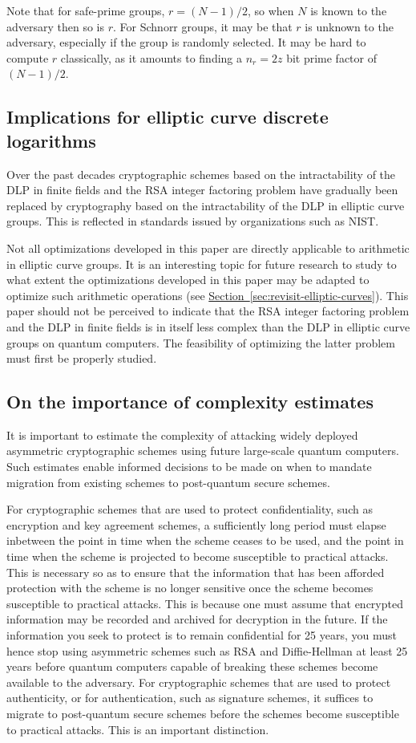 \documentclass[superscriptaddress,notitlepage,longbibliography]{revtex4-1}
\theoremstyle{definition}
\theoremstyle{definition}
\renewcommand{\sec}[1]{\hyperref[sec:#1]{Section~\ref*{sec:#1}}}
\begin{document}
Note that for safe-prime groups, $r = (N-1)/2$, so when $N$ is known to the adversary then so is $r$. For Schnorr groups, it may be that $r$ is unknown to the adversary, especially if the group is randomly selected. It may be hard to compute $r$ classically, as it amounts to finding a $n_r = 2z$ bit prime factor of $(N-1)/2$.

\subsection{Implications for elliptic curve discrete logarithms}
Over the past decades cryptographic schemes based on the intractability of the DLP in finite fields and the RSA integer factoring problem have gradually been replaced by cryptography based on the intractability of the DLP in elliptic curve groups. This is reflected in standards issued by organizations such as NIST.

Not all optimizations developed in this paper are directly applicable to arithmetic in elliptic curve groups. It is an interesting topic for future research to study to what extent the optimizations developed in this paper may be adapted to optimize such arithmetic operations (see \sec{revisit-elliptic-curves}). This paper should not be perceived to indicate that the RSA integer factoring problem and the DLP in finite fields is in itself less complex than the DLP in elliptic curve groups on quantum computers. The feasibility of optimizing the latter problem must first be properly studied.

\subsection{On the importance of complexity estimates}
It is important to estimate the complexity of attacking widely deployed asymmetric cryptographic schemes using future large-scale quantum computers. Such estimates enable informed decisions to be made on when to mandate migration from existing schemes to post-quantum secure schemes.

For cryptographic schemes that are used to protect confidentiality, such as encryption and key agreement schemes, a sufficiently long period must elapse inbetween the point in time when the scheme ceases to be used, and the point in time when the scheme is projected to become susceptible to practical attacks. This is necessary so as to ensure that the information that has been afforded protection with the scheme is no longer sensitive once the scheme becomes susceptible to practical attacks. This is because one must assume that encrypted information may be recorded and archived for decryption in the future. If the information you seek to protect is to remain confidential for 25 years, you must hence stop using asymmetric schemes such as RSA and Diffie-Hellman at least 25 years before quantum computers capable of breaking these schemes become available to the adversary. For cryptographic schemes that are used to protect authenticity, or for authentication, such as signature schemes, it suffices to migrate to post-quantum secure schemes before the schemes become susceptible to practical attacks. This is an important distinction.
\end{document}
